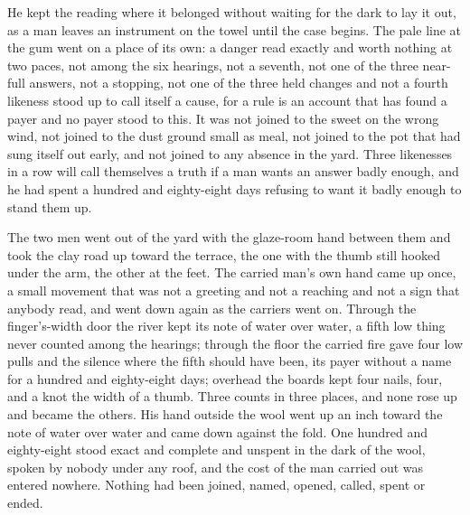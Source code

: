\scenebreak

He kept the reading where it belonged without waiting for the dark to lay it out, as a man leaves an instrument on the towel until the case begins. The pale line at the gum went on a place of its own: a danger read exactly and worth nothing at two paces, not among the six hearings, not a seventh, not one of the three near-full answers, not a stopping, not one of the three held changes and not a fourth likeness stood up to call itself a cause, for a rule is an account that has found a payer and no payer stood to this. It was not joined to the sweet on the wrong wind, not joined to the dust ground small as meal, not joined to the pot that had sung itself out early, and not joined to any absence in the yard. Three likenesses in a row will call themselves a truth if a man wants an answer badly enough, and he had spent a hundred and eighty-eight days refusing to want it badly enough to stand them up.

The two men went out of the yard with the glaze-room hand between them and took the clay road up toward the terrace, the one with the thumb still hooked under the arm, the other at the feet. The carried man's own hand came up once, a small movement that was not a greeting and not a reaching and not a sign that anybody read, and went down again as the carriers went on. Through the finger's-width door the river kept its note of water over water, a fifth low thing never counted among the hearings; through the floor the carried fire gave four low pulls and the silence where the fifth should have been, its payer without a name for a hundred and eighty-eight days; overhead the boards kept four nails, four, and a knot the width of a thumb. Three counts in three places, and none rose up and became the others. His hand outside the wool went up an inch toward the note of water over water and came down against the fold. One hundred and eighty-eight stood exact and complete and unspent in the dark of the wool, spoken by nobody under any roof, and the cost of the man carried out was entered nowhere. Nothing had been joined, named, opened, called, spent or ended.
